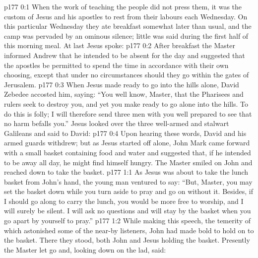 \author{Midwayer Commission}
\vs p177 0:1 When the work of teaching the people did not press them, it was the custom of Jesus and his apostles to rest from their labours each Wednesday. On this particular Wednesday they ate breakfast somewhat later than usual, and the camp was pervaded by an ominous silence; little was said during the first half of this morning meal. At last Jesus spoke: 
\vs p177 0:2 After breakfast the Master informed Andrew that he intended to be absent for the day and suggested that the apostles be permitted to spend the time in accordance with their own choosing, except that under no circumstances should they go within the gates of Jerusalem.
\vs p177 0:3 When Jesus made ready to go into the hills alone, David Zebedee accosted him, saying: “You well know, Master, that the Pharisees and rulers seek to destroy you, and yet you make ready to go alone into the hills. To do this is folly; I will therefore send three men with you well prepared to see that no harm befalls you.” Jesus looked over the three well\hyp{}armed and stalwart Galileans and said to David: 
\vs p177 0:4 Upon hearing these words, David and his armed guards withdrew; but as Jesus started off alone, John Mark came forward with a small basket containing food and water and suggested that, if he intended to be away all day, he might find himself hungry. The Master smiled on John and reached down to take the basket.
\vs p177 1:1 As Jesus was about to take the lunch basket from John’s hand, the young man ventured to say: “But, Master, you may set the basket down while you turn aside to pray and go on without it. Besides, if I should go along to carry the lunch, you would be more free to worship, and I will surely be silent. I will ask no questions and will stay by the basket when you go apart by yourself to pray.”
\vs p177 1:2 While making this speech, the temerity of which astonished some of the near\hyp{}by listeners, John had made bold to hold on to the basket. There they stood, both John and Jesus holding the basket. Presently the Master let go and, looking down on the lad, said: 
